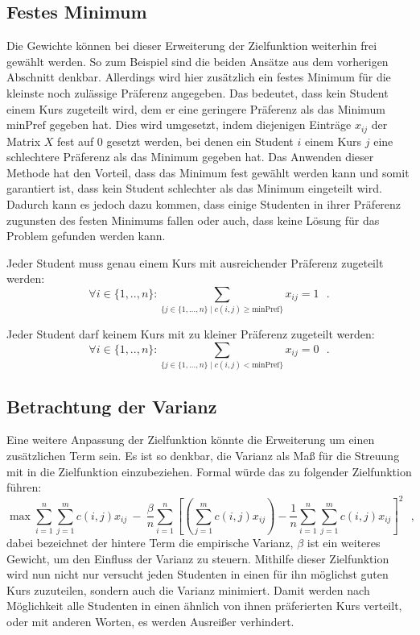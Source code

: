         \subsection{Festes Minimum}
            Die Gewichte können bei dieser Erweiterung der Zielfunktion weiterhin frei gewählt werden. 
            So zum Beispiel sind die beiden Ansätze aus dem vorherigen Abschnitt denkbar.
            Allerdings wird hier zusätzlich ein festes Minimum für die kleinste noch zulässige Präferenz angegeben.
            Das bedeutet, dass kein Student einem Kurs zugeteilt wird, dem er eine geringere Präferenz als das Minimum $ \text{minPref} $ gegeben hat.
            Dies wird umgesetzt, indem diejenigen Einträge $ x_{ij} $ der Matrix $ X $ fest auf $ 0 $ gesetzt werden, bei denen ein Student $ i $ einem Kurs $ j $ eine schlechtere Präferenz als das Minimum gegeben hat.
            Das Anwenden dieser Methode hat den Vorteil, dass das Minimum fest gewählt werden kann und somit garantiert ist, dass kein Student schlechter als das Minimum eingeteilt wird.
            Dadurch kann es jedoch dazu kommen, dass einige Studenten in ihrer Präferenz zugunsten des festen Minimums fallen oder auch, dass keine Lösung für das Problem gefunden werden kann.
            
            Jeder Student muss genau einem Kurs mit ausreichender Präferenz zugeteilt werden:
            $$ \forall {i \in \{1,..,n\}}: \sum_{\{j \in \{1, \dots, n\} \mid c(i,j) \geq \text{minPref}\}} x_{ij} = 1 ~~~.$$
            
            Jeder Student darf keinem Kurs mit zu kleiner Präferenz zugeteilt werden:
            $$ \forall {i \in \{1,..,n\}}: \sum_{\{j \in \{1, \dots, n\} \mid c(i,j) < \text{minPref}\}} x_{ij} = 0 ~~~.$$
        
        \subsection{Betrachtung der Varianz}
            Eine weitere Anpassung der Zielfunktion könnte die Erweiterung um einen zusätzlichen Term sein.
            Es ist so denkbar, die Varianz als Maß für die Streuung mit in die Zielfunktion einzubeziehen.
            Formal würde das zu folgender Zielfunktion führen:
                $$ \max \sum_{i=1}^{n} \sum_{j=1}^{m} c(i,j)x_{ij} 
                                ~-~ \frac{\beta}{n} \sum_{i=1}^{n}
                                    \left[\left(\sum_{j=1}^{m} c(i,j)x_{ij}\right) - \frac{1}{n} \sum_{i=1}^{n} \sum_{j=1}^{m} c(i,j)x_{ij}\right]^2 ~~~,$$
            dabei bezeichnet der hintere Term die empirische Varianz, $ \beta $ ist ein weiteres Gewicht, um den Einfluss der Varianz zu steuern.
            Mithilfe dieser Zielfunktion wird nun nicht nur versucht jeden Studenten in einen für ihn möglichst guten Kurs zuzuteilen, sondern auch die Varianz minimiert.
            Damit werden nach Möglichkeit alle Studenten in einen ähnlich von ihnen präferierten Kurs verteilt, oder mit anderen Worten, es werden Ausreißer verhindert.\\
            
